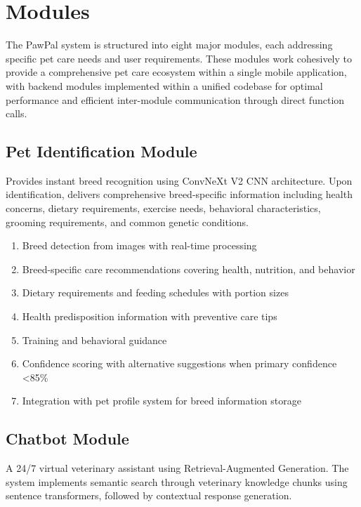 \section{Modules}

The PawPal system is structured into eight major modules, each addressing specific pet care needs and user requirements. These modules work cohesively to provide a comprehensive pet care ecosystem within a single mobile application, with backend modules implemented within a unified codebase for optimal performance and efficient inter-module communication through direct function calls.

\subsection{Pet Identification Module}

Provides instant breed recognition using ConvNeXt V2 CNN architecture. Upon identification, delivers comprehensive breed-specific information including health concerns, dietary requirements, exercise needs, behavioral characteristics, grooming requirements, and common genetic conditions.

\begin{enumerate}
    \item Breed detection from images with real-time processing
    \item Breed-specific care recommendations covering health, nutrition, and behavior
    \item Dietary requirements and feeding schedules with portion sizes
    \item Health predisposition information with preventive care tips
    \item Training and behavioral guidance
    \item Confidence scoring with alternative suggestions when primary confidence <85\%
    \item Integration with pet profile system for breed information storage
\end{enumerate}

\subsection{Chatbot Module}

A 24/7 virtual veterinary assistant using Retrieval-Augmented Generation. The system implements semantic search through veterinary knowledge chunks using sentence transformers, followed by contextual response generation. 

